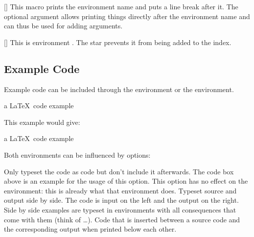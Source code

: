 \documentclass[load-preamble]{cnltx-doc}
\begin{document}
\begin{commands}
  [\sarg{}]
    This macro prints the environment name and puts a line break
    after it.  The optional argument allows printing things directly after the
    environment name and can thus be used for adding arguments.
\end{commands}

\begin{example}
  \begin{environments}
    []
      This is environment .  The star prevents it from being
      added to the index.
  \end{environments}
\end{example}

\subsection{Example Code}\label{sec:usage:examples}

Example code can be included through the  environment or the
 environment.
\begin{sourcecode}
  \begin{example}
    a \LaTeX\ code example
  \end{example}
\end{sourcecode}
This example would give:

\begin{example}
  a \LaTeX\ code example
\end{example}

Both environments can be influenced by options:
\begin{options}
    Only typeset the code as code but don't include it afterwards.  The
    code box above is an example for the usage of this option.  This option
    has no effect on the  environment: this is already what
    that environment does.
    Typeset source and output side by side.  The code is input on the left and
    the output on the right.  Side by side examples are typeset in
     environments with all consequences that come with them
    (think of  \ldots).
    Code that is inserted between a source code and the corresponding output
    when printed below each other.
\end{options}
\end{document}
